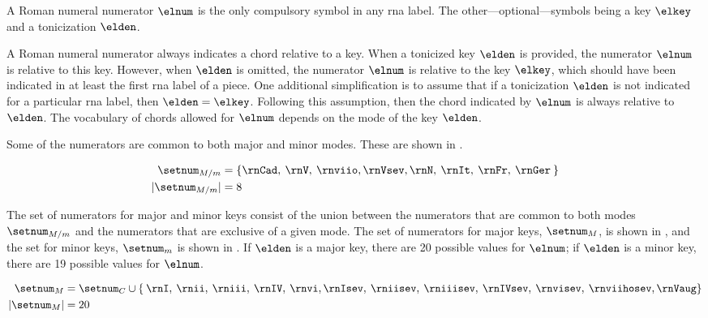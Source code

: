 
A Roman numeral numerator $\elnum$ is the only compulsory
symbol in any \gls{rna} label. The
other---optional---symbols being a key $\elkey$ and a
tonicization $\elden$.

A Roman numeral numerator always indicates a chord relative
to a key. When a tonicized key $\elden$ is provided, the
numerator $\elnum$ is relative to this key. However, when
$\elden$ is omitted, the numerator $\elnum$ is relative to
the key $\elkey$, which should have been indicated in at
least the first \gls{rna} label of a piece. One additional
simplification is to assume that if a tonicization $\elden$
is not indicated for a particular \gls{rna} label, then
$\elden = \elkey$. Following this assumption, then the chord
indicated by $\elnum$ is always relative to $\elden$. The
vocabulary of chords allowed for $\elnum$ depends on the
mode of the key $\elden$.

Some of the numerators are common to both major and minor
modes. These are shown in . 

\begin{equation}
    \label{eq:common_numerators}
    \begin{split}
    \setnum_{M/m} &= \{ \rnCad, \: \rnV, \: \rnviio,
    \rnVsev, \rnN, \: \rnIt, \: \rnFr, \: \rnGer \: \} \\
    | \setnum_{M/m} | &= 8
    \end{split}
\end{equation}

The set of numerators for major and minor keys consist of
the union between the numerators that are common to both
modes $\setnum_{M/m}$ and the numerators that are exclusive
of a given mode. The set of numerators for major keys,
$\setnum_{M}$, is shown in , and the
set for minor keys, $\setnum_{m}$ is shown in
. If $\elden$ is a major key, there
are 20 possible values for $\elnum$; if $\elden$ is a minor
key, there are 19 possible values for $\elnum$.

\begin{equation}
    \label{eq:major_numerators}
    \begin{split}
    \setnum_{M} &= \setnum_{C} \cup \{ \: \rnI, \: \rnii, \: 
    \rniii, \: \rnIV, \: \rnvi, \rnIsev, \: \rniisev, \: 
    \rniiisev, \: \rnIVsev, \: \rnvisev, \: \rnviihosev, \rnVaug \} \\
    | \setnum_{M} | &= 20
    \end{split}
\end{equation}

